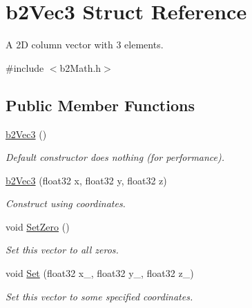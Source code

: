 \hypertarget{structb2Vec3}{}\section{b2\+Vec3 Struct Reference}
\label{structb2Vec3}


A 2D column vector with 3 elements.  




{\ttfamily \#include $<$b2\+Math.\+h$>$}

\subsection*{Public Member Functions}
\begin{DoxyCompactItemize}
\item 
\mbox{\label{structb2Vec3_a837423f66d6fb72d815e7390c09938b9}} 
\hyperlink{structb2Vec3_a837423f66d6fb72d815e7390c09938b9}{b2\+Vec3} ()
\begin{DoxyCompactList}\small\item\em Default constructor does nothing (for performance). \end{DoxyCompactList}\item 
\mbox{\label{structb2Vec3_a47df55b26ab254dcf42a16638c7feeeb}} 
\hyperlink{structb2Vec3_a47df55b26ab254dcf42a16638c7feeeb}{b2\+Vec3} (float32 x, float32 y, float32 z)
\begin{DoxyCompactList}\small\item\em Construct using coordinates. \end{DoxyCompactList}\item 
\mbox{\label{structb2Vec3_a5a459ed49f1910a347ca247f848a2dd8}} 
void \hyperlink{structb2Vec3_a5a459ed49f1910a347ca247f848a2dd8}{Set\+Zero} ()
\begin{DoxyCompactList}\small\item\em Set this vector to all zeros. \end{DoxyCompactList}\item 
\mbox{\label{structb2Vec3_a12a1bc14bbe722dfb175a492d2d00a79}} 
void \hyperlink{structb2Vec3_a12a1bc14bbe722dfb175a492d2d00a79}{Set} (float32 x\+\_\+, float32 y\+\_\+, float32 z\+\_\+)
\begin{DoxyCompactList}\small\item\em Set this vector to some specified coordinates. \end{DoxyCompactList}\item 

\end{DoxyCompactItemize}
